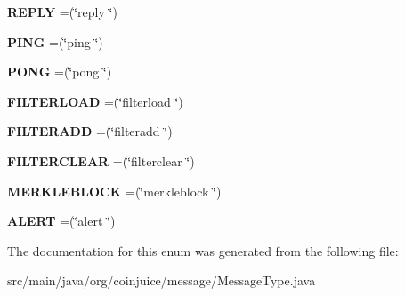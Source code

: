 \begin{DoxyCompactItemize}
\item 
\hypertarget{enumorg_1_1coinjuice_1_1message_1_1_message_type_ad62ba509a67af94a55bc4d6091b14641}{{\bfseries R\-E\-P\-L\-Y} =(\char`\"{}reply \char`\"{})}\label{enumorg_1_1coinjuice_1_1message_1_1_message_type_ad62ba509a67af94a55bc4d6091b14641}

\item 
\hypertarget{enumorg_1_1coinjuice_1_1message_1_1_message_type_a9b41c8590f8f5b3af85b2c20986970ed}{{\bfseries P\-I\-N\-G} =(\char`\"{}ping \char`\"{})}\label{enumorg_1_1coinjuice_1_1message_1_1_message_type_a9b41c8590f8f5b3af85b2c20986970ed}

\item 
\hypertarget{enumorg_1_1coinjuice_1_1message_1_1_message_type_a57438ff348ff8324768260531664b12f}{{\bfseries P\-O\-N\-G} =(\char`\"{}pong \char`\"{})}\label{enumorg_1_1coinjuice_1_1message_1_1_message_type_a57438ff348ff8324768260531664b12f}

\item 
\hypertarget{enumorg_1_1coinjuice_1_1message_1_1_message_type_a27735b041071fa092181fa3ea8354053}{{\bfseries F\-I\-L\-T\-E\-R\-L\-O\-A\-D} =(\char`\"{}filterload \char`\"{})}\label{enumorg_1_1coinjuice_1_1message_1_1_message_type_a27735b041071fa092181fa3ea8354053}

\item 
\hypertarget{enumorg_1_1coinjuice_1_1message_1_1_message_type_a7e7e1571c59af85fd7e261dc1be9922a}{{\bfseries F\-I\-L\-T\-E\-R\-A\-D\-D} =(\char`\"{}filteradd \char`\"{})}\label{enumorg_1_1coinjuice_1_1message_1_1_message_type_a7e7e1571c59af85fd7e261dc1be9922a}

\item 
\hypertarget{enumorg_1_1coinjuice_1_1message_1_1_message_type_a39795849a07dd290ee2eb86288d51aba}{{\bfseries F\-I\-L\-T\-E\-R\-C\-L\-E\-A\-R} =(\char`\"{}filterclear \char`\"{})}\label{enumorg_1_1coinjuice_1_1message_1_1_message_type_a39795849a07dd290ee2eb86288d51aba}

\item 
\hypertarget{enumorg_1_1coinjuice_1_1message_1_1_message_type_a84f3612d055cfc500bac426ee986fe78}{{\bfseries M\-E\-R\-K\-L\-E\-B\-L\-O\-C\-K} =(\char`\"{}merkleblock \char`\"{})}\label{enumorg_1_1coinjuice_1_1message_1_1_message_type_a84f3612d055cfc500bac426ee986fe78}

\item 
\hypertarget{enumorg_1_1coinjuice_1_1message_1_1_message_type_a3ca26ec23b031fc39493d027f5ddbf37}{{\bfseries A\-L\-E\-R\-T} =(\char`\"{}alert \char`\"{})}\label{enumorg_1_1coinjuice_1_1message_1_1_message_type_a3ca26ec23b031fc39493d027f5ddbf37}

\end{DoxyCompactItemize}


The documentation for this enum was generated from the following file\-:\begin{DoxyCompactItemize}
\item 
src/main/java/org/coinjuice/message/Message\-Type.\-java\end{DoxyCompactItemize}
